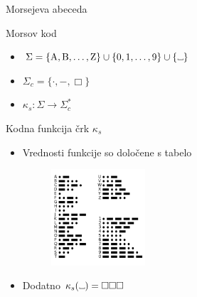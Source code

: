 \documentclass{beamer}
\theoremstyle{definition} %
\newcommand\Vtextvisiblespace[1][.3em]{%
\mbox{\kern.06em\vrule height.3ex}%
\vbox{\hrule width#1}%
\hbox{\vrule height.3ex}}
\begin{document}
\begin{frame}{Morsejeva abeceda}
    \begin{block}{Morsov kod}
        \begin{itemize}
            \item<2->  $ \Sigma = \{ \text{A},  \text{B}, \ldots, \text{Z} \} \cup \{ 0, 1, \ldots, 9 \}
            \cup \{ \Vtextvisiblespace[5pt] \} $
            \item<3-> $ \Sigma_c = \{ \cdot ,-, \Box \} $
            \item<4-> $ \kappa_s \colon \Sigma \to \Sigma_c^* $ \\ \phantom{}
        \end{itemize}
    \end{block}
\end{frame}

\begin{frame}
    \begin{block}{Kodna funkcija črk $ \kappa_s $}
        \begin{itemize}
            \item Vrednosti funkcije so določene s tabelo
            \begin{figure}[h]
                \centering
                \includegraphics[width=3.5cm]{International_Morse_Code.svg.png}
            \end{figure}
            \item Dodatno $ \kappa_s(\Vtextvisiblespace[5pt]) = \Box\Box\Box $
        \end{itemize}
    \end{block}
\end{frame}
\end{document}
